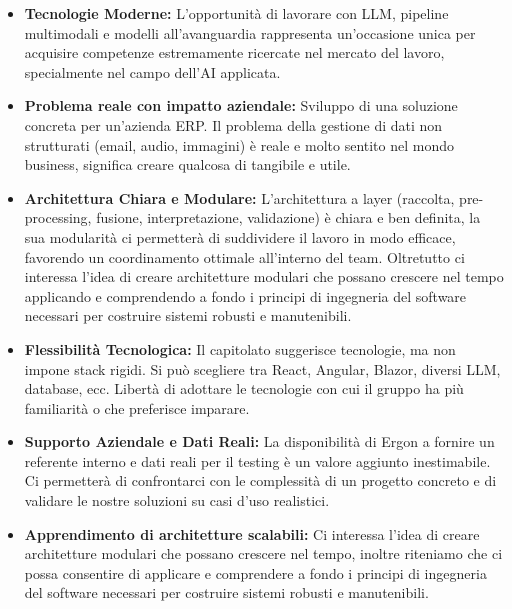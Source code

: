 \documentclass{article}
\begin{document}
	\begin{itemize}
		\item \textbf{Tecnologie Moderne:} L'opportunità di lavorare con LLM, pipeline multimodali e modelli all'avanguardia rappresenta un'occasione unica per acquisire competenze estremamente ricercate nel mercato del lavoro, specialmente nel campo dell'AI applicata.
		
		\item \textbf{Problema reale con impatto aziendale:} Sviluppo di una soluzione concreta per un'azienda ERP. Il problema della gestione di dati non strutturati (email, audio, immagini) è reale e molto sentito nel mondo business, significa creare qualcosa di tangibile e utile.
		
		\item \textbf{Architettura Chiara e Modulare:} L’architettura a layer (raccolta, pre-processing, fusione, interpretazione, validazione) è chiara e ben definita, la sua modularità ci permetterà di suddividere il lavoro in modo efficace, favorendo un coordinamento ottimale all'interno del team. Oltretutto ci interessa l'idea di creare architetture modulari che possano crescere nel tempo applicando e comprendendo a fondo i principi di ingegneria del software necessari per costruire sistemi robusti e manutenibili.
		
		\item \textbf{Flessibilità Tecnologica:} Il capitolato suggerisce tecnologie, ma non impone stack rigidi. Si può scegliere tra React, Angular, Blazor, diversi LLM, database, ecc. Libertà di adottare le tecnologie con cui il gruppo ha più familiarità o che preferisce imparare.
		
		\item \textbf{Supporto Aziendale e Dati Reali:} La disponibilità di Ergon a fornire un referente interno e dati reali per il testing è un valore aggiunto inestimabile. Ci permetterà di confrontarci con le complessità di un progetto concreto e di validare le nostre soluzioni su casi d'uso realistici.
		
		\item \textbf{Apprendimento di architetture scalabili:} Ci interessa l'idea di creare architetture modulari che possano crescere nel tempo, inoltre riteniamo che ci possa consentire di applicare e comprendere a fondo i principi di ingegneria del software necessari per costruire sistemi robusti e manutenibili.
	\end{itemize}
	
\end{document}
